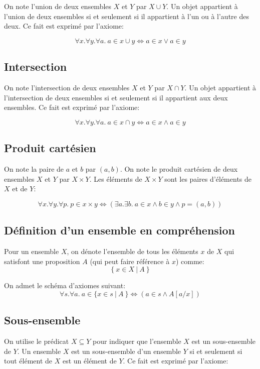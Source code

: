 On note l'union de deux ensembles $X$ et $Y$ par $X \cup Y$.
Un objet appartient à l'union de deux ensembles si et seulement si il appartient à l'un ou à l'autre des deux.
Ce fait est exprimé par l'axiome:

\[
\forall x. \forall y. \forall a.\ a \in x \cup y \iff a \in x \vee a \in y
\]

\subsection{Intersection}

On note l'intersection de deux ensembles $X$ et $Y$ par $X \cap Y$.
Un objet appartient à l'intersection de deux ensembles si et seulement si il appartient aux deux ensembles.
Ce fait est exprimé par l'axiome:

\[
\forall x. \forall y. \forall a.\ a \in x \cap y \iff a \in x \wedge a \in y
\]

\subsection{Produit cartésien}

On note la paire de $a$ et $b$ par $(a, b)$.
On note le produit cartésien de deux ensembles $X$ et $Y$ par $X \times Y$.
Les éléments de $X \times Y$ sont les paires d'éléments de $X$ et de $Y$:

\[
\forall x. \forall y. \forall p.\ p \in x \times y \iff (\exists a. \exists b.\ a \in x \wedge b \in y \wedge p = (a, b))
\]

\subsection{Définition d'un ensemble en compréhension}

Pour un ensemble $X$, on dénote l'ensemble de tous les éléments $x$ de $X$ qui satisfont une proposition $A$ (qui peut faire référence à $x$) comme:
\[
\{\ x \in X\ |\ A\ \}
\]

On admet le schéma d'axiomes suivant:
\[
\forall s. \forall a.\ a \in \{ x \in s\ |\ A\ \} \iff (a \in s \wedge A[a / x])
\]

\subsection{Sous-ensemble}

On utilise le prédicat $X \subseteq Y$ pour indiquer que l'ensemble $X$ est un sous-ensemble de $Y$.
Un ensemble $X$ est un sous-ensemble d'un ensemble $Y$ si et seulement si tout élément de $X$ est un élément de $Y$. 
Ce fait est exprimé par l'axiome:

